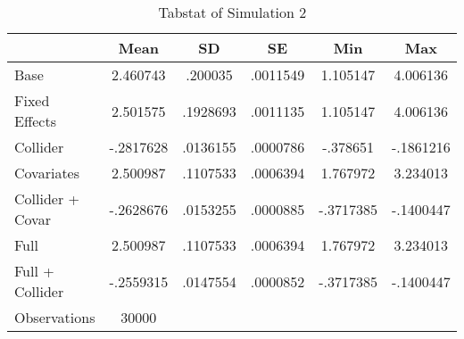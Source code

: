 \begin{table}[htbp]\centering
\def\sym#1{\ifmmode^{#1}\else\(^{#1}\)\fi}
\caption{Tabstat of Simulation 2}
\begin{tabular}{l*{1}{ccccc}}
\hline\hline
                    &        Mean&          SD&          SE&         Min&         Max\\
\hline
Base                &    2.460743&     .200035&    .0011549&    1.105147&    4.006136\\
Fixed Effects       &    2.501575&    .1928693&    .0011135&    1.105147&    4.006136\\
Collider            &   -.2817628&    .0136155&    .0000786&    -.378651&   -.1861216\\
Covariates          &    2.500987&    .1107533&    .0006394&    1.767972&    3.234013\\
Collider + Covar    &   -.2628676&    .0153255&    .0000885&   -.3717385&   -.1400447\\
Full                &    2.500987&    .1107533&    .0006394&    1.767972&    3.234013\\
Full + Collider     &   -.2559315&    .0147554&    .0000852&   -.3717385&   -.1400447\\
\hline
Observations        &       30000&            &            &            &            \\
\hline\hline
\end{tabular}
\end{table}

